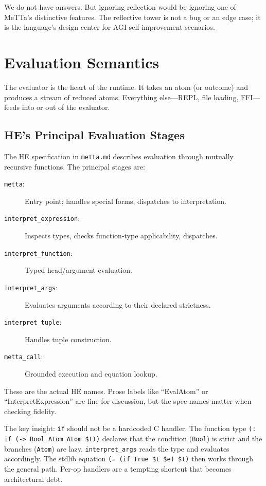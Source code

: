 \documentclass[11pt]{article}
\newcommand{\code}[1]{\texttt{#1}}
\newcommand{\HE}{\textup{HE}}
\begin{document}
We do not have answers.  But ignoring reflection would be ignoring one of
MeTTa's distinctive features.  The reflective tower is not a bug or an edge
case; it is the language's design center for AGI self-improvement scenarios.

\section{Evaluation Semantics}
\label{sec:eval}

The evaluator is the heart of the runtime.  It takes an atom (or outcome)
and produces a stream of reduced atoms.  Everything else---REPL, file
loading, FFI---feeds into or out of the evaluator.

\subsection{HE's Principal Evaluation Stages}

The \HE{} specification in \code{metta.md} describes evaluation through
mutually recursive functions.  The principal stages are:

\begin{description}
\item[\code{metta}:] Entry point; handles special forms, dispatches to
  interpretation.
\item[\code{interpret\_expression}:] Inspects types, checks function-type
  applicability, dispatches.
\item[\code{interpret\_function}:] Typed head/argument evaluation.
\item[\code{interpret\_args}:] Evaluates arguments according to their
  declared strictness.
\item[\code{interpret\_tuple}:] Handles tuple construction.
\item[\code{metta\_call}:] Grounded execution and equation lookup.
\end{description}

These are the actual \HE{} names.  Prose labels like ``EvalAtom'' or
``InterpretExpression'' are fine for discussion, but the spec names
matter when checking fidelity.

The key insight: \code{if} should not be a hardcoded C handler.  The
function type \code{(: if (-> Bool Atom Atom \$t))} declares that the
condition (\code{Bool}) is strict and the branches (\code{Atom}) are lazy.
\code{interpret\_args} reads the type and evaluates accordingly.  The
stdlib equation \code{(= (if True \$t \$e) \$t)} then works through the
general path.  Per-op handlers are a tempting shortcut that becomes
architectural debt.
\end{document}
